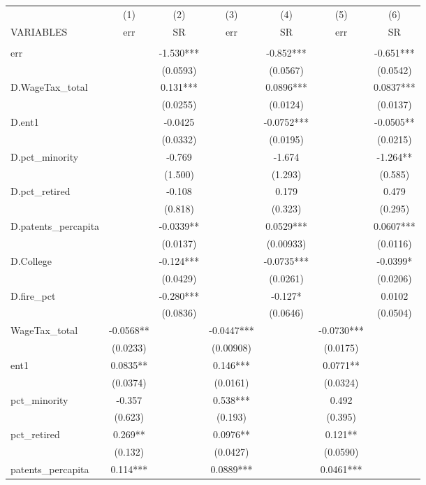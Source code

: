 \begin{tabular}{lcccccc} \hline
 & (1) & (2) & (3) & (4) & (5) & (6) \\
VARIABLES & err & SR & err & SR & err & SR \\ \hline
 &  &  &  &  &  &  \\
err &  & -1.530*** &  & -0.852*** &  & -0.651*** \\
 &  & (0.0593) &  & (0.0567) &  & (0.0542) \\
D.WageTax\_total &  & 0.131*** &  & 0.0896*** &  & 0.0837*** \\
 &  & (0.0255) &  & (0.0124) &  & (0.0137) \\
D.ent1 &  & -0.0425 &  & -0.0752*** &  & -0.0505** \\
 &  & (0.0332) &  & (0.0195) &  & (0.0215) \\
D.pct\_minority &  & -0.769 &  & -1.674 &  & -1.264** \\
 &  & (1.500) &  & (1.293) &  & (0.585) \\
D.pct\_retired &  & -0.108 &  & 0.179 &  & 0.479 \\
 &  & (0.818) &  & (0.323) &  & (0.295) \\
D.patents\_percapita &  & -0.0339** &  & 0.0529*** &  & 0.0607*** \\
 &  & (0.0137) &  & (0.00933) &  & (0.0116) \\
D.College &  & -0.124*** &  & -0.0735*** &  & -0.0399* \\
 &  & (0.0429) &  & (0.0261) &  & (0.0206) \\
D.fire\_pct &  & -0.280*** &  & -0.127* &  & 0.0102 \\
 &  & (0.0836) &  & (0.0646) &  & (0.0504) \\
WageTax\_total & -0.0568** &  & -0.0447*** &  & -0.0730*** &  \\
 & (0.0233) &  & (0.00908) &  & (0.0175) &  \\
ent1 & 0.0835** &  & 0.146*** &  & 0.0771** &  \\
 & (0.0374) &  & (0.0161) &  & (0.0324) &  \\
pct\_minority & -0.357 &  & 0.538*** &  & 0.492 &  \\
 & (0.623) &  & (0.193) &  & (0.395) &  \\
pct\_retired & 0.269** &  & 0.0976** &  & 0.121** &  \\
 & (0.132) &  & (0.0427) &  & (0.0590) &  \\
patents\_percapita & 0.114*** &  & 0.0889*** &  & 0.0461*** &  \\

\end{tabular}
